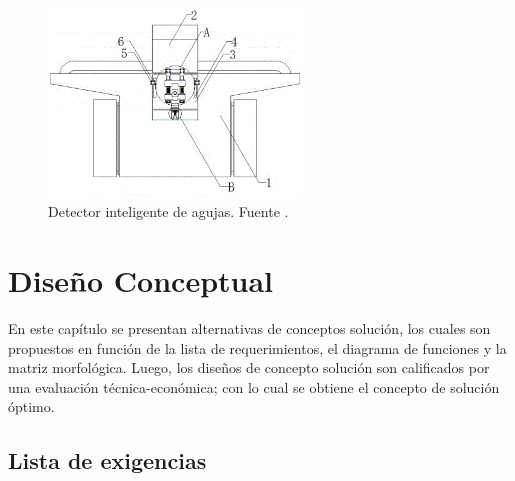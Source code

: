 \begin{figure}[H]
	\centering
	\includegraphics[width=0.6\textwidth]{img/221009135809.png}
	\caption[Detector inteligente de agujas.]{Detector inteligente de agujas. Fuente \cite{CN218147467U}.}
	\label{fig:221009135809}
\end{figure}


\chapter{Diseño Conceptual}

En este capítulo se presentan alternativas de conceptos solución, los cuales son propuestos en función de la lista de requerimientos, el diagrama de funciones y la matriz morfológica. Luego, los diseños de concepto solución son calificados por una evaluación técnica-económica; con lo cual se obtiene el concepto de solución óptimo.

\section{Lista de exigencias}

